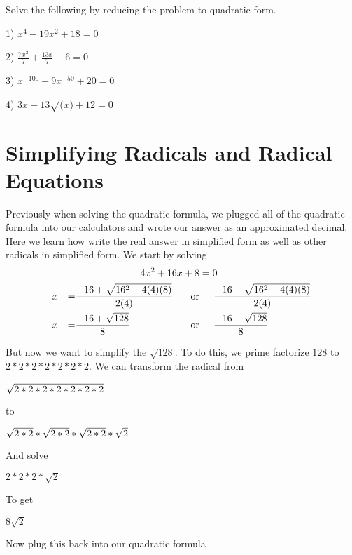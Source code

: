 \documentclass{book}
\theoremstyle{definition}
\begin{document}
Solve the following by reducing the problem to quadratic form.

\vspace{3mm}

1) $x^4-19x^2+18=0$

2) $\frac{7x^2}{7}+\frac{13x}{7}+6=0$

3) $x^{-100}-9x^{-50}+20=0$

4) $3x+13\sqrt(x)+12=0$

\section{Simplifying Radicals and Radical Equations}

Previously when solving the quadratic formula, we plugged all of the quadratic formula into our calculators and wrote our answer as an approximated decimal. Here we learn how write the real answer in simplified form as well as other radicals in simplified form.
We start by solving
\begin{equation}
\label{(9.1)}
\begin{align*}
&&&&4x^2+16x+8&=0\\
&x&=&\frac{-16+\sqrt{16^2-4(4)(8)}}{2(4)}\hspace{-.6in}&\text{or}&\hspace{.2in}\frac{-16-\sqrt{16^2-4(4)(8)}}{2(4)} \\
&x&=&\frac{-16+\sqrt{128}}{8}&\text{or}&\hspace{.2in}\frac{-16-\sqrt{128}}{8}
\end{align*}
\end{equation}

But now we want to simplify the $\sqrt{128}$. To do this, we prime factorize $128$ to $2*2*2*2*2*2*2$. We can transform the radical from

\begin{center}
$                \sqrt{2*2*2*2*2*2*2} \\ $

                    to

$\\ \sqrt{2*2}*\sqrt{2*2}*\sqrt{2*2}*\sqrt{2}$
\end{center}
And solve

\begin{center}
                    $2*2*2*\sqrt{2}$
\end{center}
To get

\begin{center}
                        $8\sqrt{2}$
\end{center}
Now plug this back into our quadratic formula
\end{document}

